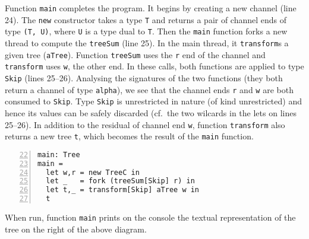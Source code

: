 Function \lstinline|main| completes the program. It begins by creating
a new channel (line 24). The \lstinline|new| constructor takes a type
\lstinline|T| and returns a pair of channel ends of type
\lstinline|(T, U)|, where \lstinline|U| is a type dual to
\lstinline|T|. Then the \lstinline|main| function forks a new thread
to compute the \lstinline|treeSum| (line 25). In the main thread, it
\lstinline|transform|s a given tree (\lstinline|aTree|). Function
\lstinline|treeSum| uses the \lstinline|r| end of the channel and
\lstinline|transform| uses \lstinline|w|, the other end. In these
calls, both functions are applied to type \lstinline|Skip| (lines
25--26). Analysing the signatures of the two functions (they both
return a channel of type \lstinline|alpha|), we see that the channel
ends \lstinline|r| and \lstinline|w| are both consumed to
\lstinline|Skip|. Type \lstinline|Skip| is unrestricted in nature (of
kind unrestricted) and hence its values can be safely discarded (cf.\
the two wilcards in the lets on lines 25--26). In addition to the residual of
channel end \lstinline|w|, function \lstinline|transform| also returns
a new tree \lstinline|t|, which becomes the result of the
\lstinline|main| function.
%
\begin{lstlisting}[numbers=left,firstnumber=22]
main: Tree
main =
  let w,r = new TreeC in
  let _   = fork (treeSum[Skip] r) in
  let t,_ = transform[Skip] aTree w in
  t
\end{lstlisting}

When run, function \lstinline|main| prints on the console the textual
representation of the tree on the right of the above diagram.

